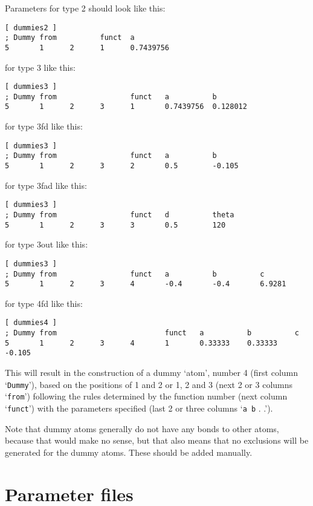 Parameters for type 2 should look like this:
{\small\begin{verbatim}
[ dummies2 ] 
; Dummy from          funct  a 
5       1      2      1      0.7439756
\end{verbatim}}

for type 3 like this:
{\small\begin{verbatim}
[ dummies3 ]
; Dummy from                 funct   a          b
5       1      2      3      1       0.7439756  0.128012
\end{verbatim}}

for type 3fd like this:
{\small\begin{verbatim}
[ dummies3 ]
; Dummy from                 funct   a          b
5       1      2      3      2       0.5        -0.105
\end{verbatim}}

for type 3fad like this:
{\small\begin{verbatim}
[ dummies3 ]
; Dummy from                 funct   d          theta
5       1      2      3      3       0.5        120
\end{verbatim}}

for type 3out like this:
{\small\begin{verbatim}
[ dummies3 ]
; Dummy from                 funct   a          b          c
5       1      2      3      4       -0.4       -0.4       6.9281
\end{verbatim}}

for type 4fd like this:
{\small\begin{verbatim}
[ dummies4 ]
; Dummy from                         funct   a          b          c
5       1      2      3      4       1       0.33333    0.33333    -0.105
\end{verbatim}}

This will result in the construction of a dummy `atom', number 4
(first column `\verb'Dummy''), based on the positions of 1 and 2 or 1,
2 and 3 (next 2 or 3 columns `\verb'from'') following the rules
determined by the function number (next column `\verb'funct'') with
the parameters specified (last 2 or three columns `\verb'a b' . .').

Note that dummy atoms generally do not have any bonds to other atoms,
because that would make no sense, but that also means that no
exclusions will be generated for the dummy atoms. These should be
added manually.

\section{Parameter files}
\label{sec:paramfiles}
